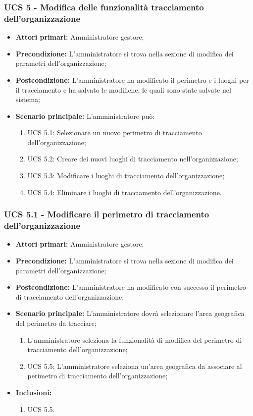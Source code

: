 \subsubsection{UCS 5 - Modifica delle funzionalità tracciamento dell'organizzazione}%
\begin{itemize}
    \item \textbf{Attori primari:} Amministratore gestore;
    \item \textbf{Precondizione:} L'amministratore si trova nella sezione di modifica dei parametri dell'organizzazione;
    \item \textbf{Postcondizione:} L'amministratore ha modificato il perimetro e i luoghi per il tracciamento e ha salvato le modifiche, le quali sono state salvate nel sistema;
    \item \textbf{Scenario principale:} L'amministratore può:
    \begin{enumerate}
        \item UCS 5.1: Selezionare un nuovo perimetro di tracciamento dell'organizzazione;
        \item UCS 5.2: Creare dei nuovi luoghi di tracciamento nell'organizzazione;
        \item UCS 5.3: Modificare i luoghi di tracciamento dell'organizzazione;
        \item UCS 5.4: Eliminare i luoghi di tracciamento dell'organizzazione.
    \end{enumerate}
\end{itemize}

\subsubsection{UCS 5.1 - Modificare il perimetro di tracciamento dell'organizzazione}%
\begin{itemize}
    \item \textbf{Attori primari:} Amministratore gestore;
    \item \textbf{Precondizione:} L'amministratore si trova nella sezione di modifica dei parametri dell'organizzazione;
    \item \textbf{Postcondizione:} L'amministratore ha modificato con successo il perimetro di tracciamento dell'organizzazione;
    \item \textbf{Scenario principale:} L'amministratore dovrà selezionare l'area geografica del perimetro da tracciare;
    \begin{enumerate}%
        \item L'amministratore seleziona la funzionalità di modifica del perimetro di tracciamento dell'organizzazione;
        \item UCS 5.5: L'amministratore seleziona un'area geografica da associare al perimetro di tracciamento dell'organizzazione;
    \end{enumerate} 
    \item \textbf{Inclusioni:}
    \begin{enumerate}
        \item UCS 5.5.
    \end{enumerate}
\end{itemize}

